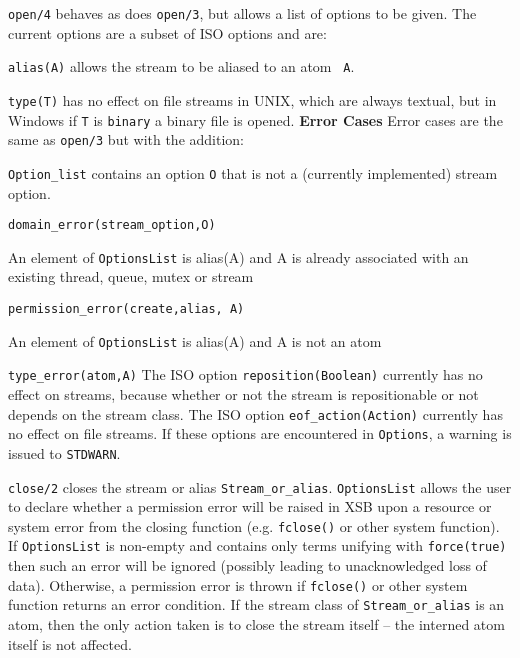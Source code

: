 \begin{description}
%
{\tt open/4} behaves as does {\tt open/3}, but allows a list of
options to be given.  The current options are a subset of ISO options
and are:
\bi
\item {\tt alias(A)} allows the stream to be aliased to an atom {\tt
  A}.
%
\item {\tt type(T)} has no effect on file streams in UNIX, which are
  always textual, but in Windows if {\tt T} is {\tt binary} a binary
  file is opened.
\ei
%
{\bf Error Cases}  Error cases are the same as {\tt open/3} but with
the addition: 
\bi
\item {\tt Option\_list} contains an option {\tt O} that is not a
  (currently implemented) stream option.  
\bi
\item {\tt domain\_error(stream\_option,O)}
\ei
\item An element of {\tt OptionsList} is alias(A) and A is already
  associated with an existing thread, queue, mutex or stream 
\bi
\item {\tt permission\_error(create,alias, A)}
\ei
\item An element of {\tt OptionsList} is alias(A) and A is not an atom
\bi
\item {\tt type\_error(atom,A)}
\ei
\ei
%
\compatability 
%
The ISO option {\tt reposition(Boolean)} currently has no effect on
streams, because whether or not the stream is repositionable or not
depends on the stream class.  The ISO option {\tt eof\_action(Action)}
currently has no effect on file streams.  If these options are
encountered in {\tt Options}, a warning is issued to {\tt STDWARN}.

%
{\tt close/2} closes the stream or alias {\tt Stream\_or\_alias}.
{\tt OptionsList} allows the user to declare whether a permission
error will be raised in XSB upon a resource or system error from the
closing function (e.g. {\tt fclose()} or other system function).  If
{\tt OptionsList} is non-empty and contains only terms unifying with
{\tt force(true)} then such an error will be ignored (possibly leading
to unacknowledged loss of data).  Otherwise, a permission error is
thrown if {\tt fclose()} or other system function returns an error
condition.  If the stream class of {\tt Stream\_or\_alias} is an atom,
then the only action taken is to close the stream itself -- the
interned atom itself is not affected.


\end{description}
